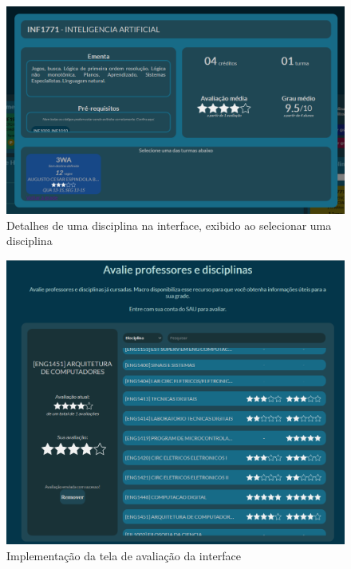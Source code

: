 \begin{figure}[ht]
    \begin{center}
    \includegraphics[width=360pt]{figuras/detalhe-turma.png}
    \caption{Detalhes de uma disciplina na interface, exibido ao selecionar uma disciplina}
    \label{fig:detalhe-turmas-impl}
    \end{center}
\end{figure}

\begin{figure}[ht]
    \begin{center}
    \includegraphics[width=360pt]{figuras/tela-avaliacoes.png}
    \caption{Implementação da tela de avaliação da interface}
    \label{fig:tela-avaliacao-impl}
    \end{center}
\end{figure}

